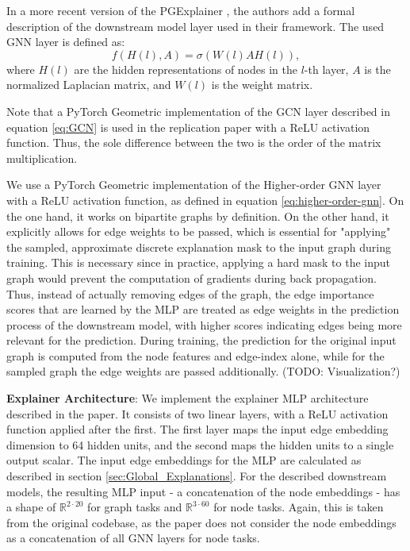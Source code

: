 In a more recent version of the PGExplainer \cite{10423141}, the authors add a formal description of the downstream model layer used in their framework. The used GNN layer is defined as:
\begin{equation}
    f(H(l),A)=\sigma(W(l)AH(l)),
\end{equation}
where $H(l)$ are the hidden representations of nodes in the $l$-th layer, $A$ is the normalized Laplacian matrix, and $W(l)$ is the weight matrix.

Note that a PyTorch Geometric implementation of the GCN layer described in equation \ref{eq:GCN} is used in the replication paper \cite{holdijk2021re} with a ReLU activation function. Thus, the sole difference between the two is the order of the matrix multiplication. \bigskip

We use a PyTorch Geometric implementation of the Higher-order GNN layer with a ReLU activation function, as defined in equation \ref{eq:higher-order-gnn}. On the one hand, it works on bipartite graphs by definition. On the other hand, it explicitly allows for edge weights to be passed, which is essential for "applying" the sampled, approximate discrete explanation mask to the input graph during training. This is necessary since in practice, applying a hard mask to the input graph would prevent the computation of gradients during back propagation. Thus, instead of actually removing edges of the graph, the edge importance scores that are learned by the MLP are treated as edge weights in the prediction process of the downstream model, with higher scores indicating edges being more relevant for the prediction. During training, the prediction for the original input graph is computed from the node features and edge-index alone, while for the sampled graph the edge weights are passed additionally. (TODO: Visualization?)\bigskip

\textbf{Explainer Architecture}:
We implement the explainer MLP architecture described in the paper. It consists of two linear layers, with a ReLU activation function applied after the first. The first layer maps the input edge embedding dimension to 64 hidden units, and the second maps the hidden units to a single output scalar. The input edge embeddings for the MLP are calculated as described in section \ref{sec:Global_Explanations}. For the described downstream models, the resulting MLP input - a concatenation of the node embeddings - has a shape of $\mathbb{R}^{2\cdot20}$ for graph tasks and $\mathbb{R}^{3\cdot60}$ for node tasks. Again, this is taken from the original codebase, as the paper does not consider the node embeddings as a concatenation of all GNN layers for node tasks.

